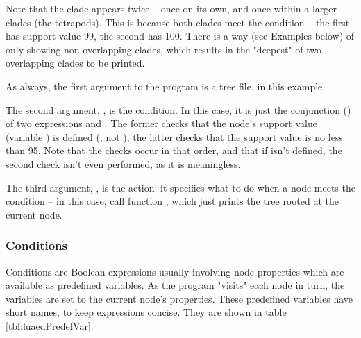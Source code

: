 Note that the  clade appears twice -- once on
its own, and once within a larger clades (the tetrapods). This is because both
clades meet the condition -- the first has support value 99, the second has 100.
There is a way (see Examples below) of only showing non-overlapping clades,
which results in the "deepest" of two overlapping clades to be printed.

As always, the first argument to the program is a tree file,
 in this example.

The second argument, , is the condition.  In this
case, it is just the conjunction () of two expressions
 and .  The former checks that the node's support
value (variable ) is defined (\ie, not ); the latter
checks that the support value is no less than 95. Note that the checks occur in
that order, and that if  isn't defined, the second check isn't even
performed, as it is meaningless.

The third argument, , is the action: it specifies what to do when a
node meets the condition -- in this case, call function ,
which just prints the tree rooted at the current node.

\subsubsection{Conditions}

Conditions are Boolean expressions usually involving node properties which are
available as predefined variables. As the program "visits" each node in turn,
the variables are set to the current node's properties.  These predefined
variables have short names, to keep expressions concise. They are shown in table
\in{}[tbl:luaedPredefVar].

